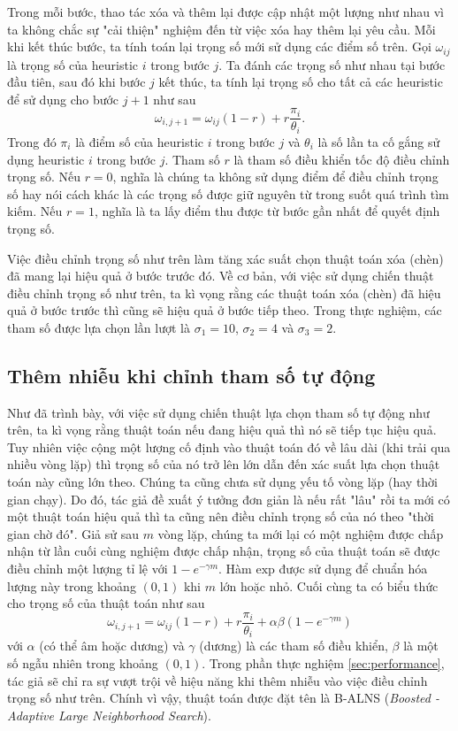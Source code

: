 Trong mỗi bước, thao tác xóa và thêm lại được cập nhật một lượng như nhau vì ta không chắc sự "cải thiện" nghiệm đến từ việc xóa hay thêm lại yêu cầu. Mỗi khi kết thúc bước, ta tính toán lại trọng số mới sử dụng các điểm số trên. Gọi $\omega_{ij}$ là trọng số của heuristic $i$ trong bước $j$. Ta đánh các trọng số như nhau tại bước đầu tiên, sau đó khi bước $j$ kết thúc, ta tính lại trọng số cho tất cả các heuristic để sử dụng cho bước $j+1$ như sau
\begin{equation}
	\label{eq:adaptive_weight}
	\omega_{i, j+1} = \omega_{ij}(1-r)+r\frac{\pi_i}{\theta_i}.
\end{equation}
Trong đó $\pi_i$ là điểm số của heuristic $i$ trong bước $j$ và $\theta_i$ là số lần ta cố gắng sử dụng heuristic $i$ trong bước $j$. Tham số $r$ là tham số điều khiển tốc độ điều chỉnh trọng số. Nếu $r=0$, nghĩa là chúng ta không sử dụng điểm để điều chỉnh trọng số hay nói cách khác là các trọng số được giữ nguyên từ trong suốt quá trình tìm kiếm. Nếu $r=1$, nghĩa là ta lấy điểm thu được từ bước gần nhất để quyết định trọng số.

Việc điều chỉnh trọng số như trên làm tăng xác suất chọn thuật toán xóa (chèn) đã mang lại hiệu quả ở bước trước đó. Về cơ bản, với việc sử dụng chiến thuật điều chỉnh trọng số như trên, ta kì vọng rằng các thuật toán xóa (chèn) đã hiệu quả ở bước trước thì cũng sẽ hiệu quả ở bước tiếp theo. Trong thực nghiệm, các tham số được lựa chọn lần lượt là $\sigma_1=10$, $\sigma_2=4$ và $\sigma_3=2$.

\subsection{Thêm nhiễu khi chỉnh tham số tự động}
Như đã trình bày, với việc sử dụng chiến thuật lựa chọn tham số tự động như trên, ta kì vọng rằng thuật toán nếu đang hiệu quả thì nó sẽ tiếp tục hiệu quả. Tuy nhiên việc cộng một lượng cố định vào thuật toán đó về lâu dài (khi trải qua nhiều vòng lặp) thì trọng số của nó trở lên lớn dẫn đến xác suất lựa chọn thuật toán này cũng lớn theo. Chúng ta cũng chưa sử dụng yếu tố vòng lặp (hay thời gian chạy). Do đó, tác giả đề xuất ý tưởng đơn giản là nếu rất "lâu" rồi ta mới có một thuật toán hiệu quả thì ta cũng nên điều chỉnh trọng số của nó theo "thời gian chờ đó". Giả sử sau $m$ vòng lặp, chúng ta mới lại có một nghiệm được chấp nhận từ lần cuối cùng nghiệm được chấp nhận, trọng số của thuật toán sẽ được điều chỉnh một lượng tỉ lệ với $1 - e^{-\gamma m}$. Hàm $\text{exp}$ được sử dụng để chuẩn hóa lượng này trong khoảng $(0,1)$ khi $m$ lớn hoặc nhỏ. Cuối cùng ta có biểu thức cho trọng số của thuật toán như sau
\begin{equation}
	\label{eq:boost_adaptive_weight}
	\omega_{i, j+1} = \omega_{ij}(1-r)+r\frac{\pi_i} {\theta_i} + \alpha \beta (1 - e^{-\gamma m})
\end{equation}
với $\alpha$ (có thể âm hoặc dương) và $\gamma$ (dương) là các tham số điều khiển, $\beta$ là một số ngẫu nhiên trong khoảng $(0,1)$. Trong phần thực nghiệm \ref{sec:performance}, tác giả sẽ chỉ ra sự vượt trội về hiệu năng khi thêm nhiễu vào việc điều chỉnh trọng số như trên. Chính vì vậy, thuật toán được đặt tên là B-ALNS (\textit{Boosted - Adaptive Large Neighborhood Search}).

